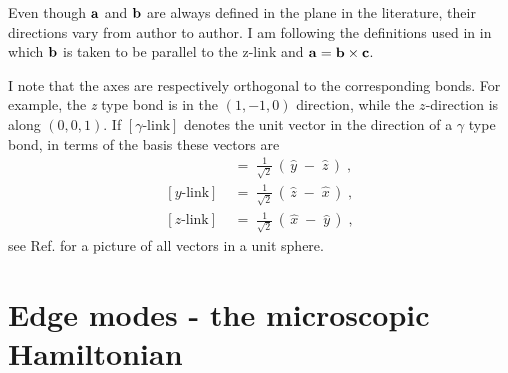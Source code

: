   



Even though $\bf{a}$ and $\bf{b}$ are always defined in the plane in the literature, their directions vary from author to author. I am following the definitions used in \cite{yokoi2020halfinteger,Liu_2018} in which $\bf{b}$ is taken to be parallel to the z-link and $\bf{a}= \bf{b} \times \bf{c} $. 

I note that the axes are respectively orthogonal to the corresponding bonds. For example, the \textit{z} type bond is in the $(1,-1,0)$ direction, while the $z$-direction is along $(0,0,1)$. If $[\gamma\text{-link}]$ denotes the unit vector in the direction of a $\gamma$ type bond, in terms of the basis these vectors are 
\begin{align}
    [x\text{-link}] \; & = \; \frac{1}{\sqrt{2}} \, \left( \, \hat{y} \; - \; \hat{z} \, \right) \; , \\
    [y\text{-link}] \; & = \; \frac{1}{\sqrt{2}} \, \left( \, \hat{z} \; - \; \hat{x} \, \right) \; , \\
    [z\text{-link}] \; & = \; \frac{1}{\sqrt{2}} \, \left( \, \hat{x} \; - \; \hat{y} \, \right) \; , 
\end{align}
see Ref.\cite{Liu_2018} for a picture of all vectors in a unit sphere.



\section{Edge modes - the microscopic Hamiltonian}

